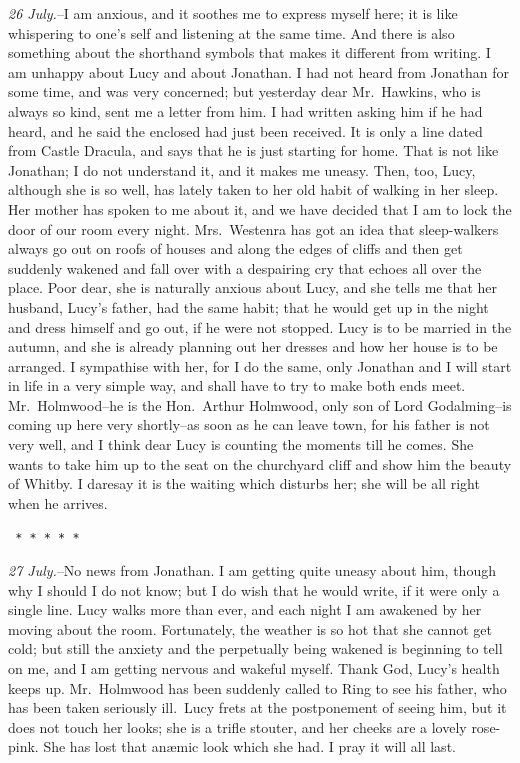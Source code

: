 \documentclass[12pt,openright]{book}
\begin{document}
\textit{26 July.}–I am anxious, and it soothes me to express myself here; it is like whispering to one’s self and listening at the same time. And there is also something about the shorthand symbols that makes it different from writing. I am unhappy about Lucy and about Jonathan. I had not heard from Jonathan for some time, and was very concerned; but yesterday dear Mr. Hawkins, who is always so kind, sent me a letter from him. I had written asking him if he had heard, and he said the enclosed had just been received. It is only a line dated from Castle Dracula, and says that he is just starting for home. That is not like Jonathan; I do not understand it, and it makes me uneasy. Then, too, Lucy, although she is so well, has lately taken to her old habit of walking in her sleep. Her mother has spoken to me about it, and we have decided that I am to lock the door of our room every night. Mrs. Westenra has got an idea that sleep-walkers always go out on roofs of houses and along the edges of cliffs and then get suddenly wakened and fall over with a despairing cry that echoes all over the place. Poor dear, she is naturally anxious about Lucy, and she tells me that her husband, Lucy’s father, had the same habit; that he would get up in the night and dress himself and go out, if he were not stopped. Lucy is to be married in the autumn, and she is already planning out her dresses and how her house is to be arranged. I sympathise with her, for I do the same, only Jonathan and I will start in life in a very simple way, and shall have to try to make both ends meet. Mr. Holmwood–he is the Hon. Arthur Holmwood, only son of Lord Godalming–is coming up here very shortly–as soon as he can leave town, for his father is not very well, and I think dear Lucy is counting the moments till he comes. She wants to take him up to the seat on the churchyard cliff and show him the beauty of Whitby. I daresay it is the waiting which disturbs her; she will be all right when he arrives.

\texttt{   *       *       *       *       *}

\textit{27 July.}–No news from Jonathan. I am getting quite uneasy about him, though why I should I do not know; but I do wish that he would write, if it were only a single line. Lucy walks more than ever, and each night I am awakened by her moving about the room. Fortunately, the weather is so hot that she cannot get cold; but still the anxiety and the perpetually being wakened is beginning to tell on me, and I am getting nervous and wakeful myself. Thank God, Lucy’s health keeps up. Mr. Holmwood has been suddenly called to Ring to see his father, who has been taken seriously ill. Lucy frets at the postponement of seeing him, but it does not touch her looks; she is a trifle stouter, and her cheeks are a lovely rose-pink. She has lost that anæmic look which she had. I pray it will all last.
\end{document}
